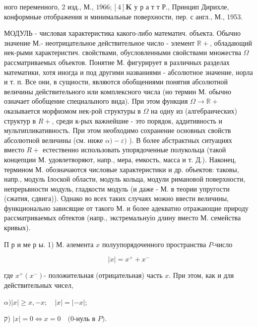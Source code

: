 \documentclass[10pt]{article}
\begin{document}
ного переменного, 2 изд., М., $1966 ;[4] \mathbf{K}$ у р а т т Р., Принцип Дирихле, конформные отображения и минимальные поверхности, пер. с англ., М., 1953.



МОДУЛЬ - числовая характеристика какого-либо математич. объекта. Обычно значение М.- неотрицательное действительное число - элемент $\mathbb{R}+$, обладающий нек-рыми характеристич. свойствами, обусловленными свойствами множества $\Omega$ рассматриваемых объектов. Понятие М. фигурирует в различных разделах математики, хотя иногда и под другими названиями - абсолютное значение, норла и т. п. Все они, в сущности, являются обобщениями понятия абсолютной величины действительного или комплексного числа (но термин М. обычно означает обобщение специалыного вида). При этом функция $\Omega \rightarrow \mathbb{R}+$ оказывается морфизмом нек-рой структуры в $\Omega$ на одну из (алгебраических) структур в $R+$, среди к-рых важнейшие - это порядок, аддитивность и мультипликативность. При этом необходимо сохранение основных свойств абсолютной величины (см. ниже $\alpha)-\varepsilon)$ ). В более абстрактных ситуациях вместо $R+$ естественно использовать упорядоченные полукольца (такой концепции М. удовлетворяют, напр., мера, емкость, масса и т. Д.). Наконец, термином М. обозначаются числовые характеристики и др. объектов: таковы, напр., модуль Ілоской области, модуль кольца, модули римановой поверхности, непрерьвности модуль, гладкости модуль (и даже - М. в теории упругости (сжатия, сдвига)). Однако во всех таких случаях можно ввести величины, функционально зависящие от такого М. и более адекватно отражающие природу рассматриваемых обтектов (напр., экстремальнуіо длину вместо М. семейства кривых).



П р и ме р ы. 1) М. әлемента $x$ полуупорядоченного пространства $P$-число



\[

|x|=x^{+}+x^{-}

\]



где $x^{+}\left(x^{-}\right)$- положительная (отрицательная) часть $x$. При этом, как и для действительных чисел,



$\alpha)|x| \geqslant x,-x ; \quad|x|=|-x| ;$



ק) $|x|=0 \Longleftrightarrow x=0 \quad(0$-нуль в $P)$.
\end{document}
